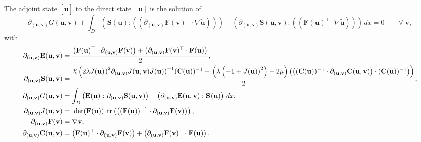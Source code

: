 \documentclass[preview]{standalone}
\let\oldcdot\cdot
\let\cdot\oldcdot
\begin{document}
The adjoint state $\left[ \tilde{\mathbf{ u }}\right]$ to the direct state $\left[ {\mathbf{ u }}\right]$ is the solution of
\begin{dmath*}
\partial_{({\mathbf{ u }},{\mathbf{ v }})} G({\mathbf{ u }},{\mathbf{ v }}) +  \int_{D} \left( \mathbf S({\mathbf{ u }}) \mathrel{:} \left( \left(  \partial_{({\mathbf{ u }},{\mathbf{ v }})} \mathbf F({\mathbf{ v }})^\top  \cdot  \nabla \tilde{\mathbf{ u }}  \right) \right)\right) + \left( \partial_{({\mathbf{ u }},{\mathbf{ v }})} \mathbf S({\mathbf{ u }},{\mathbf{ v }}) \mathrel{:} \left( \left(  \mathbf F({\mathbf{ u }})^\top  \cdot  \nabla \tilde{\mathbf{ u }}  \right) \right)\right) \,dx = 0\qquad \forall\; {\mathbf{ v }} , 
\end{dmath*}
with 
\begin{align*}
\partial_{({\mathbf{ u }},{\mathbf{ v }})} \mathbf E({\mathbf{ u }},{\mathbf{ v }}) &= \frac{\left(  \mathbf F({\mathbf{ u }})^\top  \cdot \partial_{({\mathbf{ u }},{\mathbf{ v }})} \mathbf F({\mathbf{ v }}) \right) + \left(  \partial_{({\mathbf{ u }},{\mathbf{ v }})} \mathbf F({\mathbf{ v }})^\top  \cdot \mathbf F({\mathbf{ u }}) \right)}{2},\\
\partial_{({\mathbf{ u }},{\mathbf{ v }})} \mathbf S({\mathbf{ u }},{\mathbf{ v }}) &= \frac{\raisebox{\depth}{$\chi$} \left(2 \lambda {J({\mathbf{ u }}))}^{2} \partial_{({\mathbf{ u }},{\mathbf{ v }})} J({\mathbf{ u }},{\mathbf{ v }}) {J({\mathbf{ u }}))}^{-1}  (\mathbf C({\mathbf{ u }}))^{-1}  - \left(\lambda \left(-1 + {J({\mathbf{ u }}))}^{2}\right) - 2 \mu\right) \left( \left(  (\mathbf C({\mathbf{ u }}))^{-1}  \cdot \partial_{({\mathbf{ u }},{\mathbf{ v }})} \mathbf C({\mathbf{ u }},{\mathbf{ v }}) \right) \cdot  (\mathbf C({\mathbf{ u }}))^{-1}  \right)\right)}{2},\\
\partial_{({\mathbf{ u }},{\mathbf{ v }})} G({\mathbf{ u }},{\mathbf{ v }}) &=  \int_{D} \left( \mathbf E({\mathbf{ u }}) \mathrel{:} \partial_{({\mathbf{ u }},{\mathbf{ v }})} \mathbf S({\mathbf{ u }},{\mathbf{ v }}) \right) + \left( \partial_{({\mathbf{ u }},{\mathbf{ v }})} \mathbf E({\mathbf{ u }},{\mathbf{ v }}) \mathrel{:} \mathbf S({\mathbf{ u }}) \right) \,dx,\\
\partial_{({\mathbf{ u }},{\mathbf{ v }})} J({\mathbf{ u }},{\mathbf{ v }}) &=  \;\operatorname{det}(\mathbf F({\mathbf{ u }}))   \,\operatorname{tr}\left(\left(  (\mathbf F({\mathbf{ u }}))^{-1}  \cdot \partial_{({\mathbf{ u }},{\mathbf{ v }})} \mathbf F({\mathbf{ v }}) \right)\right) ,\\
\partial_{({\mathbf{ u }},{\mathbf{ v }})} \mathbf F({\mathbf{ v }}) &=  \nabla {\mathbf{ v }} ,\\
\partial_{({\mathbf{ u }},{\mathbf{ v }})} \mathbf C({\mathbf{ u }},{\mathbf{ v }}) &= \left(  \mathbf F({\mathbf{ u }})^\top  \cdot \partial_{({\mathbf{ u }},{\mathbf{ v }})} \mathbf F({\mathbf{ v }}) \right) + \left(  \partial_{({\mathbf{ u }},{\mathbf{ v }})} \mathbf F({\mathbf{ v }})^\top  \cdot \mathbf F({\mathbf{ u }}) \right).
 \end{align*}
\end{document}
